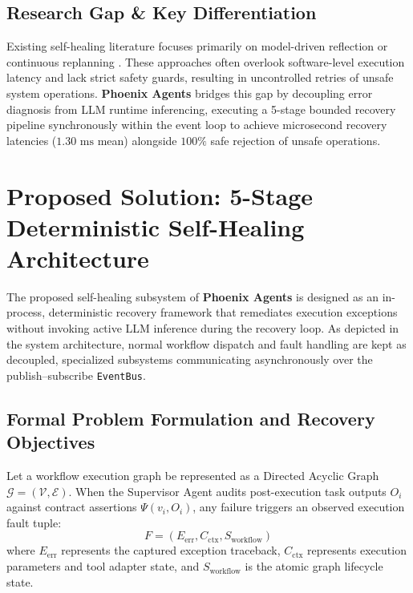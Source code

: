 \documentclass[conference]{IEEEtran}
\begin{document}
\subsection{Research Gap & Key Differentiation}
Existing self-healing literature focuses primarily on model-driven reflection or continuous replanning \cite{babu2026, jeong2026, patel2026sustech}. These approaches often overlook software-level execution latency and lack strict safety guards, resulting in uncontrolled retries of unsafe system operations. \textbf{Phoenix Agents} bridges this gap by decoupling error diagnosis from LLM runtime inferencing, executing a 5-stage bounded recovery pipeline synchronously within the event loop to achieve microsecond recovery latencies ($1.30\text{ ms}$ mean) alongside $100\%$ safe rejection of unsafe operations.

\section{Proposed Solution: 5-Stage Deterministic Self-Healing Architecture}
\label{sec:proposed_solution}

The proposed self-healing subsystem of \textbf{Phoenix Agents} is designed as an in-process, deterministic recovery framework that remediates execution exceptions without invoking active LLM inference during the recovery loop. As depicted in the system architecture, normal workflow dispatch and fault handling are kept as decoupled, specialized subsystems communicating asynchronously over the publish--subscribe \texttt{EventBus}.

\subsection{Formal Problem Formulation and Recovery Objectives}
Let a workflow execution graph be represented as a Directed Acyclic Graph $\mathcal{G} = (\mathcal{V}, \mathcal{E})$. When the Supervisor Agent audits post-execution task outputs $O_i$ against contract assertions $\Psi(v_i, O_i)$, any failure triggers an observed execution fault tuple:
\begin{equation}
F = (E_{\text{err}}, C_{\text{ctx}}, S_{\text{workflow}})
\end{equation}
where $E_{\text{err}}$ represents the captured exception traceback, $C_{\text{ctx}}$ represents execution parameters and tool adapter state, and $S_{\text{workflow}}$ is the atomic graph lifecycle state.
\end{document}
